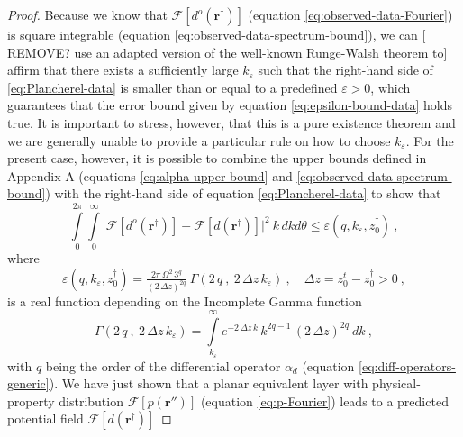 \begin{proof}
	Because we know that $\mathcal{F} [ d^{o}(\mathbf{r}^{\dagger}) ]$ 
	(equation \ref{eq:observed-data-Fourier}) is square integrable 
	(equation \ref{eq:observed-data-spectrum-bound}), we can [ REMOVE? use an adapted version 
	of the well-known Runge-Walsh theorem 
	\cite[e.g.,][]{walsh1929, moritz1980, borre_krarup2006, grafarend2015}
	to] affirm that there exists a sufficiently
	large $k_{\varepsilon}$ such that the right-hand side of 
	\ref{eq:Plancherel-data} is smaller than or equal to a predefined 
	$\varepsilon > 0$, which guarantees that the error bound given by equation 
	\ref{eq:epsilon-bound-data} holds true.
	It is important to stress, however, that this is a pure existence theorem and 
	we are generally unable to provide a particular rule on how to choose $k_{\varepsilon}$.
	For the present case, however, it is possible to combine 
	the upper bounds defined in Appendix A (equations \ref{eq:alpha-upper-bound} and 
	\ref{eq:observed-data-spectrum-bound}) with the right-hand side of 
	equation \ref{eq:Plancherel-data} to show that
	\begin{equation}
		\int\limits_{0}^{2\pi} \int\limits_{0}^{\infty}
		\vert \mathcal{F} [ d^{o}(\mathbf{r}^{\dagger}) ] - \mathcal{F} [
		d(\mathbf{r}^{\dagger}) ] \vert^{2} \: k \, dkd\theta \le
		\varepsilon(q, k_{\varepsilon}, z^{\dagger}_{0}) \: ,
		\label{eq:Plancherel-data-epsilon}
	\end{equation}
	where
	\begin{equation}
		\varepsilon(q, k_{\varepsilon}, z^{\dagger}_{0}) = \tfrac{2\pi \, \Omega^{2} \, 3^{q}}{(2 \, \Delta z)^{2q}} \: 
		\Gamma(2 \, q \: , \: 2 \, \Delta z \, k_{\varepsilon}) \: ,
		\quad \Delta z = z^{t}_{0} - z^{\dagger}_{0} > 0 \: ,
		\label{eq:epsilon}
	\end{equation}
	is a real function depending on the Incomplete Gamma function \citep[][ p. 899]{gradshteyn_ryzhik2007}
	\begin{equation}
		\Gamma(2 \, q \: , \: 2 \, \Delta z \, k_{\varepsilon}) = 
		\int\limits_{k_{\varepsilon}}^{\infty}
		e^{- 2 \, \Delta z \, k } \, k^{2q-1} \, (2 \, \Delta z)^{2q} 
		\: d k \: ,
		\label{eq:incomplete-Gamma-function}
	\end{equation}
	with $q$ being the order of the differential operator $\alpha_{d}$ (equation \ref{eq:diff-operators-generic}).
	We have just shown that a planar equivalent layer with physical-property distribution 
	$\mathcal{F} [ p(\mathbf{r}'') ]$ (equation \ref{eq:p-Fourier})
	leads to a predicted potential field $\mathcal{F} [ d(\mathbf{r}^{\dagger}) ]$ 

\end{proof}
